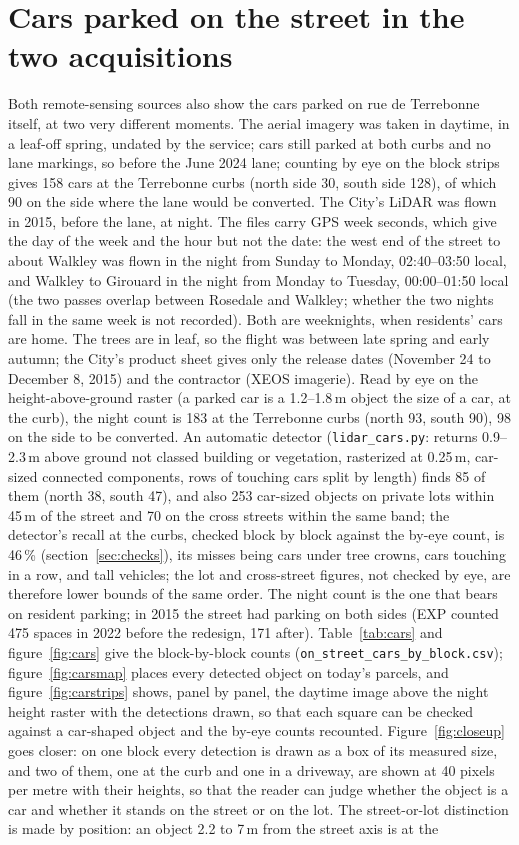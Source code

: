 \documentclass[11pt]{article}
\begin{document}
\section{Cars parked on the street in the two acquisitions}
Both remote-sensing sources also show the cars parked on rue de Terrebonne itself, at two very different moments. The aerial imagery was taken in daytime, in a leaf-off spring, undated by the service; cars still parked at both curbs and no lane markings, so before the June 2024 lane; counting by eye on the block strips gives 158 cars at the Terrebonne curbs (north side 30, south side 128), of which 90 on the side where the lane would be converted. The City's LiDAR was flown in 2015, before the lane, at night. The files carry GPS week seconds, which give the day of the week and the hour but not the date: the west end of the street to about Walkley was flown in the night from Sunday to Monday, 02:40--03:50 local, and Walkley to Girouard in the night from Monday to Tuesday, 00:00--01:50 local (the two passes overlap between Rosedale and Walkley; whether the two nights fall in the same week is not recorded). Both are weeknights, when residents' cars are home. The trees are in leaf, so the flight was between late spring and early autumn; the City's product sheet gives only the release dates (November 24 to December 8, 2015) and the contractor (XEOS imagerie). Read by eye on the height-above-ground raster (a parked car is a 1.2--1.8\,m object the size of a car, at the curb), the night count is 183 at the Terrebonne curbs (north 93, south 90), 98 on the side to be converted. An automatic detector (\texttt{lidar\_cars.py}: returns 0.9--2.3\,m above ground not classed building or vegetation, rasterized at 0.25\,m, car-sized connected components, rows of touching cars split by length) finds 85 of them (north 38, south 47), and also 253 car-sized objects on private lots within 45\,m of the street and 70 on the cross streets within the same band; the detector's recall at the curbs, checked block by block against the by-eye count, is 46\,\% (section~\ref{sec:checks}), its misses being cars under tree crowns, cars touching in a row, and tall vehicles; the lot and cross-street figures, not checked by eye, are therefore lower bounds of the same order. The night count is the one that bears on resident parking; in 2015 the street had parking on both sides (EXP counted 475 spaces in 2022 before the redesign, 171 after). Table~\ref{tab:cars} and figure~\ref{fig:cars} give the block-by-block counts (\texttt{on\_street\_cars\_by\_block.csv}); figure~\ref{fig:carsmap} places every detected object on today's parcels, and figure~\ref{fig:carstrips} shows, panel by panel, the daytime image above the night height raster with the detections drawn, so that each square can be checked against a car-shaped object and the by-eye counts recounted. Figure~\ref{fig:closeup} goes closer: on one block every detection is drawn as a box of its measured size, and two of them, one at the curb and one in a driveway, are shown at 40 pixels per metre with their heights, so that the reader can judge whether the object is a car and whether it stands on the street or on the lot. The street-or-lot distinction is made by position: an object 2.2 to 7\,m from the street axis is at the 
\end{document}
